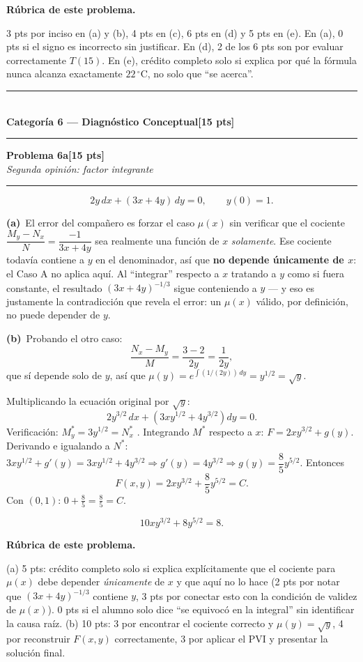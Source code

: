 \documentclass[11pt,letterpaper]{article}
\newcommand{\categoria}[3]{%
  \bigskip\bigskip\noindent
  \rule{\linewidth}{0.8pt}\\[2pt]
  {\Large\bfseries Categoría #1 --- #2}\hfill\textbf{[#3 pts]}\\[2pt]
  \rule{\linewidth}{0.8pt}\vspace{4pt}
}
\newcommand{\problema}[3]{%
  \bigskip\noindent
  {\large\textbf{Problema #1}}\hfill\textbf{[#2 pts]}\\[3pt]
  {\small\itshape #3}\par
  \vspace{2pt}\hrule\vspace{8pt}
}
\newcommand{\subparte}[2]{%
  \medskip\noindent\textbf{(#1}\ #2\par\smallskip
}
\newenvironment{resultado}
  {\begin{mdframed}[linecolor=black,linewidth=0.6pt,
    innerleftmargin=6pt,innerrightmargin=6pt,innertopmargin=4pt,innerbottommargin=4pt]
   \bfseries}
  {\end{mdframed}}
\newenvironment{rubrica}{%
  \begin{mdframed}[linecolor=black,linewidth=0.6pt,
    innerleftmargin=8pt,innerrightmargin=8pt,innertopmargin=5pt,innerbottommargin=5pt]
  \small\textbf{Rúbrica de este problema.}\par\smallskip
}{\end{mdframed}}
\begin{document}
\begin{rubrica}
3 pts por inciso en (a) y (b), 4 pts en (c), 6 pts en (d) y 5 pts en (e). En (a), 0 pts si el signo es incorrecto sin justificar. En (d), 2 de los 6 pts son por evaluar correctamente $T(15)$. En (e), crédito completo solo si explica por qué la fórmula nunca alcanza exactamente $22\,^\circ\text{C}$, no solo que ``se acerca''.
\end{rubrica}

\newpage
\categoria{6}{Diagnóstico Conceptual}{15}

\problema{6a}{15}{Segunda opinión: factor integrante}

\[
2y\,dx+(3x+4y)\,dy=0, \qquad y(0)=1.
\]

\subparte{a)}{El error del compañero es forzar el caso $\mu(x)$ sin verificar que el cociente $\dfrac{M_y-N_x}{N}=\dfrac{-1}{3x+4y}$ sea realmente una función de $x$ \emph{solamente}. Ese cociente todavía contiene a $y$ en el denominador, así que \textbf{no depende únicamente de $x$}: el Caso A no aplica aquí. Al ``integrar'' respecto a $x$ tratando a $y$ como si fuera constante, el resultado $(3x+4y)^{-1/3}$ sigue conteniendo a $y$ — y eso es justamente la contradicción que revela el error: un $\mu(x)$ válido, por definición, no puede depender de $y$.}

\subparte{b)}{Probando el otro caso:
\[
\frac{N_x-M_y}{M} = \frac{3-2}{2y} = \frac{1}{2y},
\]
que sí depende solo de $y$, así que $\mu(y)=e^{\int (1/(2y))\,dy}=y^{1/2}=\sqrt y$.

Multiplicando la ecuación original por $\sqrt y$:
\[
2y^{3/2}\,dx + \left(3xy^{1/2}+4y^{3/2}\right) dy = 0.
\]
Verificación: $M^*_y = 3y^{1/2} = N^*_x$ \checkmark. Integrando $M^*$ respecto a $x$: $F=2xy^{3/2}+g(y)$. Derivando e igualando a $N^*$: $3xy^{1/2}+g'(y)=3xy^{1/2}+4y^{3/2} \Rightarrow g'(y)=4y^{3/2} \Rightarrow g(y)=\dfrac85y^{5/2}$. Entonces
\[
F(x,y)=2xy^{3/2}+\frac85y^{5/2}=C.
\]
Con $(0,1)$: $0+\frac85=\frac85=C$.
\begin{resultado}
\[
10xy^{3/2}+8y^{5/2} = 8.
\]
\end{resultado}}

\begin{rubrica}
(a) 5 pts: crédito completo solo si explica explícitamente que el cociente para $\mu(x)$ debe depender \emph{únicamente} de $x$ y que aquí no lo hace (2 pts por notar que $(3x+4y)^{-1/3}$ contiene $y$, 3 pts por conectar esto con la condición de validez de $\mu(x)$). 0 pts si el alumno solo dice ``se equivocó en la integral'' sin identificar la causa raíz. (b) 10 pts: 3 por encontrar el cociente correcto y $\mu(y)=\sqrt y$, 4 por reconstruir $F(x,y)$ correctamente, 3 por aplicar el PVI y presentar la solución final.
\end{rubrica}
\end{document}
